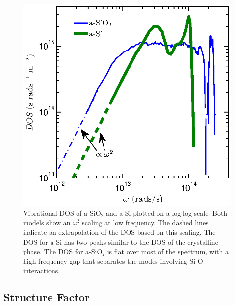 \documentclass[aps,prb,onecolumn,preprint,superscriptaddress,footinbib,amsmath,amssymb,floatfix]{revtex4}
\begin{document}
\begin{figure}
\begin{center}
\includegraphics[scale=1.0]
{fig2.eps}
\vspace*{-5mm}
\end{center}
\caption{\label{FIG:DOS} Vibrational DOS of a-SiO$_2$ and a-Si 
plotted on a log-log scale. 
Both models show an $\omega^{2}$ scaling at low frequency. The 
dashed lines indicate an extrapolation of the DOS based on this scaling. 
The DOS for a-Si has two peaks similar to the 
DOS of the crystalline phase.\cite{landry_effect_2010} 
The DOS for a-SiO$_2$ is flat over most of the spectrum, with a high 
frequency gap that separates 
the modes involving Si-O interactions.\cite{mcgaughey_thermal_2004} 
}
\end{figure}

\subsection{\label{S:Structure}Structure Factor}
\end{document}
